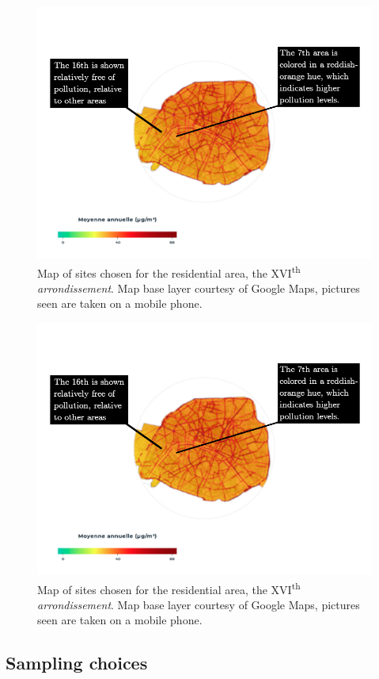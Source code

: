 \documentclass[11pt,letterpaper]{article}
\begin{document}
\begin{figure}[H]
    \begin{minipage}{\textwidth}
    \centering
    \includegraphics[width=0.7\linewidth]{no2_map.png}
    \caption{Map of sites chosen for the residential area, the XVI\textsuperscript{th} \textit{arrondissement}. Map base layer courtesy of Google Maps, pictures seen are taken on a mobile phone.}
    \end{minipage}
\end{figure}

\begin{figure}[H]
    \begin{minipage}{\textwidth}
    \centering
    \includegraphics[width=0.7\linewidth]{no2_map.png}
    \caption{Map of sites chosen for the residential area, the XVI\textsuperscript{th} \textit{arrondissement}. Map base layer courtesy of Google Maps, pictures seen are taken on a mobile phone.}
    \end{minipage}
\end{figure}

\subsection{Sampling choices}
\end{document}
